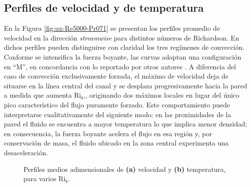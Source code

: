 \subsection{Perfiles de velocidad y de temperatura} \label{sec:velo_temp}

En la Figura \ref{fig:ux-Re5000-Pr071} se presentan los perfiles promedio de velocidad en la dirección \textit{streamwise} para distintos números de Richardson. En dichos perfiles pueden distinguirse con claridad los tres regímenes de convección. Conforme se intensifica la fuerza boyante, las curvas adoptan una configuración en ``M'', en concordancia con lo reportado por otros autores \cite{you2003direct, zhou2024direct}. A diferencia del caso de convección exclusivamente forzada, el máximo de velocidad deja de situarse en la línea central del canal y se desplaza progresivamente hacia la pared a medida que aumenta Ri$_b$,\cite{carr1973velocity, steiner1971reverse, zhou2024direct}, originando dos máximos locales en lugar del único pico característico del flujo puramente forzado. Este comportamiento puede interpretarse cualitativamente del siguiente modo: en las proximidades de la pared el fluido se encuentra a mayor temperatura lo que implica menor densidad; en consecuencia, la fuerza boyante acelera el flujo en esa región y, por conservación de masa, el fluido ubicado en la zona central experimenta una desaceleración.

\begin{figure}[H]
  \centering
  \caption{Perfiles medios adimensionales de \textbf{(a)} velocidad y \textbf{(b)} temperatura, para varios Ri$_b$.}
\end{figure}

